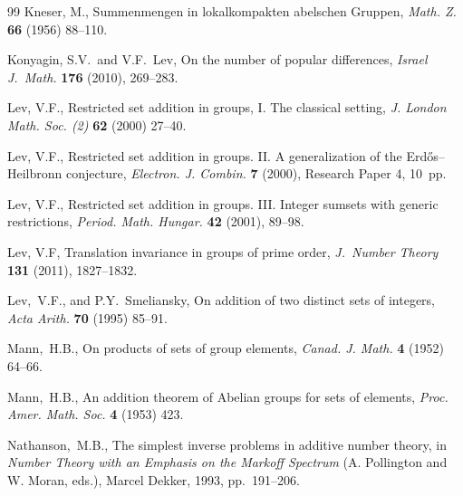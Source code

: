 \documentclass[12pt,reqno]{amsart}
\theoremstyle{definition}
\begin{document}
\begin{thebibliography}{99}
Kneser, M., Summenmengen in lokalkompakten abelschen Gruppen,  {\em Math. Z.} {\bf 66} (1956) 88--110.


Konyagin, S.V.~and V.F.~Lev, On the number of popular differences,
{\em Israel J.~Math.} {\bf 176} (2010), 269--283.

Lev, V.F.,  Restricted set addition in groups, I. The classical setting, {\em J. London Math. Soc. (2)}
{\bf 62} (2000) 27--40.

Lev, V.F., Restricted set addition in groups. II. A generalization of the Erd\H{o}s--Heilbronn conjecture,
{\em Electron. J. Combin.} {\bf 7} (2000), Research Paper 4, 10~pp.

Lev, V.F.,
Restricted set addition in groups. III. Integer sumsets with generic restrictions, {\em Period. Math. Hungar.} {\bf 42} (2001), 89--98.

Lev, V.F, Translation invariance in groups of prime order,
{\em J.~Number Theory} {\bf 131} (2011), 1827--1832.

Lev,~V.F., and P.Y.~Smeliansky,
On addition of two distinct sets of integers,
{\em Acta Arith.} {\bf 70} (1995) 85--91.



Mann,~H.B.,
On products of sets of group elements,
{\em Canad. J. Math.} {\bf 4} (1952) 64--66.

Mann,~H.B.,
An addition theorem of Abelian groups for sets of elements,
{\em Proc. Amer. Math. Soc.} {\bf 4} (1953) 423.




Nathanson,~M.B.,
The simplest inverse problems in additive number theory, in {\em Number Theory with an Emphasis on the Markoff Spectrum} (A. Pollington and W. Moran, eds.), Marcel Dekker, 1993, pp.~191--206.


\end{thebibliography}
\end{document}
